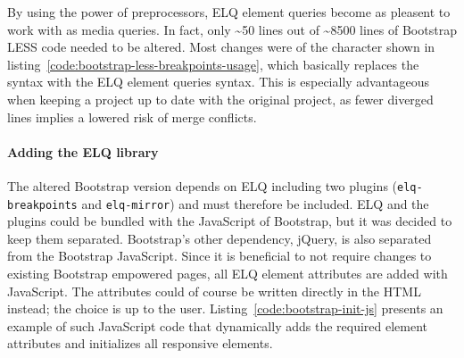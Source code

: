\documentclass[a4paper,11pt]{kth-mag}
\newcommand{\code}[1]{\texttt{#1}}
\begin{document}
      By using the power of preprocessors, \gls{ELQ} element queries become as pleasent to work with as \gls{media queries}.
      In fact, only \textasciitilde50 lines out of \textasciitilde8500 lines of \gls{Bootstrap} \gls{LESS} code needed to be altered.
      Most changes were of the character shown in listing~\ref{code:bootstrap-less-breakpoints-usage}, which basically replaces the  syntax with the \gls{ELQ} element queries syntax.
      This is especially advantageous when keeping a  project up to date with the original project, as fewer diverged lines implies a lowered risk of merge conflicts.

      \paragraph{Adding the \gls{ELQ} library}
      The altered \gls{Bootstrap} version depends on \gls{ELQ} including two plugins (\code{elq-breakpoints} and \code{elq-mirror}) and must therefore be included.
      \gls{ELQ} and the plugins could be bundled with the \gls{JavaScript} of \gls{Bootstrap}, but it was decided to keep them separated.
      \gls{Bootstrap}'s other dependency, jQuery, is also separated from the \gls{Bootstrap} \gls{JavaScript}.
      Since it is beneficial to not require changes to existing \gls{Bootstrap} empowered pages, all \gls{ELQ} element attributes are added with \gls{JavaScript}.
      The attributes could of course be written directly in the \gls{HTML} instead; the choice is up to the user.
      Listing~\ref{code:bootstrap-init-js} presents an example of such \gls{JavaScript} code that dynamically adds the required element attributes and initializes all \gls{responsive} \glspl{element}.
\end{document}
